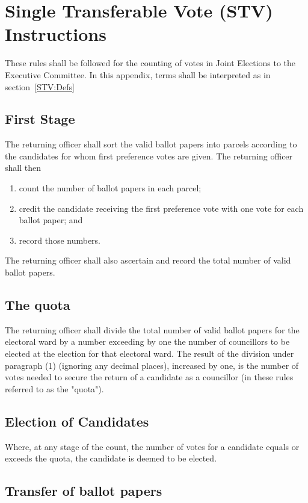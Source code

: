 \chapter{Single Transferable Vote (STV) Instructions}

\appnpara These rules shall be followed for the counting of votes in Joint Elections to the Executive Committee. In this appendix, terms shall be interpreted as in section~\ref{STV:Defs}

\section{First Stage}
\appnpara The returning officer shall sort the valid ballot papers into parcels according to the candidates for whom first preference votes are given.
\appnpara The returning officer shall then
\begin{enumerate}
    \item count the number of ballot papers in each parcel;
    \item credit the candidate receiving the first preference vote with one vote for each ballot paper; and
    \item record those numbers.
\end{enumerate}
\appnpara The returning officer shall also ascertain and record the total number of valid ballot papers.

\section{The quota}

\appnpara The returning officer shall divide the total number of valid ballot papers for the electoral ward by a number exceeding by one the number of councillors to be elected at the election for that electoral ward.
\appnpara The result of the division under paragraph (1) (ignoring any decimal places), increased by one, is the number of votes needed to secure the return of a candidate as a councillor (in these rules referred to as the "quota").

\section{Election of Candidates}

\appnpara Where, at any stage of the count, the number of votes for a candidate equals or exceeds the quota, the candidate is deemed to be elected.

\section{Transfer of ballot papers}

